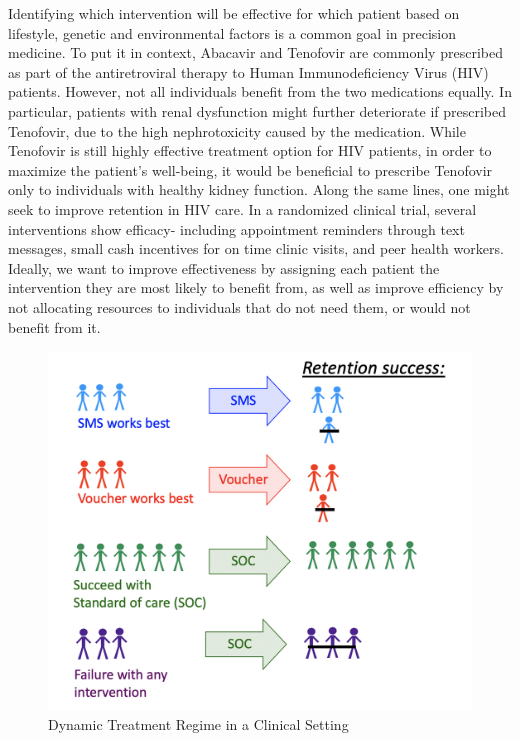 \documentclass[12pt, krantz2,]{krantz}
\theoremstyle{definition}
\theoremstyle{definition}
\theoremstyle{definition}
\newcommand{\1}{\mathbbm{1}}
\begin{document}
Identifying which intervention will be effective for which patient based on
lifestyle, genetic and environmental factors is a common goal in precision
medicine. To put it in context, Abacavir and Tenofovir are commonly prescribed
as part of the antiretroviral therapy to Human Immunodeficiency Virus (HIV)
patients. However, not all individuals benefit from the two medications equally.
In particular, patients with renal dysfunction might further deteriorate if
prescribed Tenofovir, due to the high nephrotoxicity caused by the medication.
While Tenofovir is still highly effective treatment option for HIV patients, in
order to maximize the patient's well-being, it would be beneficial to prescribe
Tenofovir only to individuals with healthy kidney function. Along the same
lines, one might seek to improve retention in HIV care. In a randomized clinical
trial, several interventions show efficacy- including appointment reminders
through text messages, small cash incentives for on time clinic visits, and peer
health workers. Ideally, we want to improve effectiveness by assigning each
patient the intervention they are most likely to benefit from, as well as
improve efficiency by not allocating resources to individuals that do not need
them, or would not benefit from it.

\begin{figure}

{\centering \includegraphics[width=0.8\linewidth]{img/image/DynamicA_Illustration} 

}

\caption{Dynamic Treatment Regime in a Clinical Setting}\label{fig:unnamed-chunk-1}
\end{figure}
\end{document}
